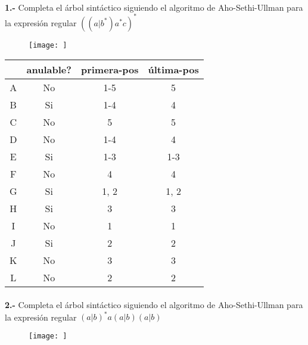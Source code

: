 \documentclass[11pt,a4paper]{report}
\begin{document}
\paragraph{}

\paragraph{}
\textbf{1.-} Completa el árbol sintáctico siguiendo el algoritmo de Aho-Sethi-Ullman para la expresión regular $ ((a|b^*)a^*c)^* $
\begin{figure}[ht!]
\centering
\texttt{[image: ]}
\end{figure}

\begin{tabular} {| c | c | c | c |}\hline
 & anulable? & primera-pos & última-pos\\ \hline
A & No & 1-5 & 5\\ \hline
B & Si & 1-4 & 4\\ \hline
C & No & 5 & 5\\ \hline
D & No & 1-4 & 4\\ \hline
E & Si & 1-3 & 1-3\\ \hline
F & No & 4 & 4\\ \hline
G & Si & 1, 2 & 1, 2\\ \hline
H & Si & 3 & 3\\ \hline
I & No & 1 & 1\\ \hline
J & Si & 2 & 2\\ \hline
K & No & 3 & 3\\ \hline
L & No & 2 & 2\\ \hline
\end{tabular}\paragraph{}
\textbf{2.-} Completa el árbol sintáctico siguiendo el algoritmo de Aho-Sethi-Ullman para la expresión regular $ (a|b)^*a(a|b)(a|b) $
\begin{figure}[ht!]
\centering
\texttt{[image: ]}
\end{figure}
\end{document}
